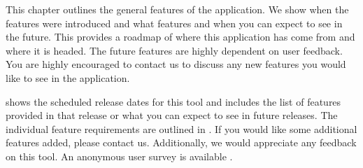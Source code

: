 This chapter outlines the general features of the \texttt{\getsoftwarename{}} application. We show when the features were introduced and what features and when you can expect to see in the future. This provides a roadmap of where this application has come from and where it is headed. The future features are highly dependent on user feedback. You are highly encouraged to contact us to discuss any new features you would like to see in the application.\\


 shows the scheduled release dates for this tool and includes the list of features provided in that release or what you can expect to see in future releases. The individual feature requirements are outlined in . If you would like some additional features added, please contact us.
Additionally, we would appreciate any feedback on this tool. An anonymous
user survey is available . \\

